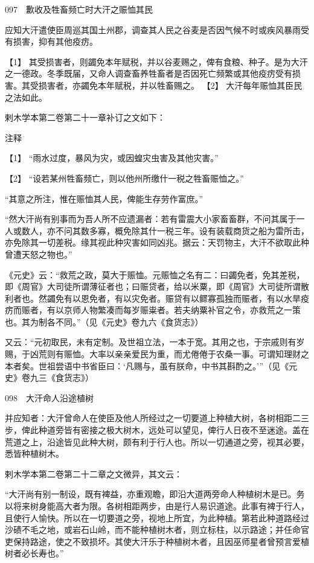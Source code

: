 \documentclass[12pt,UTF8]{ctexbook}
\begin{document}
097　歉收及牲畜频亡时大汗之赈恤其民

应知大汗遣使臣周巡其国土州郡，调查其人民之谷麦是否因气候不时或疾风暴雨受有损害，抑有其他疫疠。





【1】 其受损害者，则蠲免本年赋税，并以谷麦赐之，俾有食粮、种子。是为大汗之一德政。冬季既届，又命人调查畜养牲畜者是否因死亡频繁或其他疫疠受有损害。其受损害者，亦蠲免本年赋税，并以牲畜赐之。 【2】 大汗每年赈恤其臣民之法如此。

剌木学本第二卷第二十一章补订之文如下：

注释

【1】 “雨水过度，暴风为灾，或因蝗灾虫害及其他灾害。”

【2】 “设若某州牲畜频亡，则以他州所缴什一税之牲畜赈恤之。”

“其意之所注，惟在赈恤其人民，俾能生存劳作富庶。”

“然大汗尚有别事而为吾人所不应遗漏者：若有雷震大小家畜畜群，不问其属于一人或数人，亦不问其数多寡，概免除其什一税三年。设有装载商货之船为雷所击，亦免除其一切差税。缘其视此种灾害如同凶兆。据云：天罚物主，大汗不欲取此种曾遭天怒之物也。”

《元史》云：“救荒之政，莫大于赈恤。元赈恤之名有二：曰蠲免者，免其差税，即《周官》大司徒所谓薄征者也；曰赈贷者，给以米粟，即《周官》大司徒所谓散利者也。然蠲免有以恩免者，有以灾免者。赈贷有以鳏寡孤独而赈者，有以水旱疫疠而赈者，有以京师人物繁凑而每岁赈粜者。若夫纳粟补官之令，亦救荒之一策也。其为制各不同。”（见《元史》卷九六《食货志》）

又云：“元初取民，未有定制。及世祖立法，一本于宽。其用之也，于宗戚则有岁赐，于凶荒则有赈恤。大率以亲亲爱民为重，而尤倦倦于农桑一事。可谓知理财之本者矣。世祖尝语中书省臣曰：‘凡赐与，虽有朕命，中书其斟酌之。’”（见《元史》卷九三《食货志》）





098　大汗命人沿途植树

并应知者：大汗曾命人在使臣及他人所经过之一切要道上种植大树，各树相距二三步，俾此种道旁皆有密接之极大树木，远处可以望见，俾行人日夜不至迷途。盖在荒道之上，沿途皆见此种大树，颇有利于行人也。所以一切通道之旁，视其必要，悉皆种植树木。

剌木学本第二卷第二十二章之文微异，其文云：

“大汗尚有别一制设，既有裨益，亦重观瞻，即沿大道两旁命人种植树木是已。务以将来树身能高大者为限。各树相距两步，由是行人易识道途。此事有裨于行人，且使行人愉快。所以在一切要道之旁，视地上所宜，为此种植。第若此种道路经过沙碛不毛之地，或岩石山岭，而不能种植树木者，则立标柱，以示路途；并任命官吏保持路途，使之不致损坏。其使大汗乐于种植树木者，且因巫师星者曾预言爱植树者必长寿也。”
\end{document}
